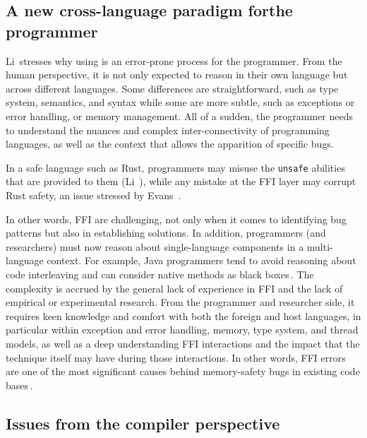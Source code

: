 \documentclass[nomenclature, english, bibtex]{kththesis}
\begin{document}
\subsection[A new cross-language paradigm for the programmer]{A new cross-language paradigm for\linebreak[4] the programmer}

Li\,\cite{li_improving_2014} stresses why using  is an error-prone process for the programmer. From the human perspective, it is not only expected to reason in their own language but across different languages. Some differences are straightforward, such as  type system, semantics, and syntax while some are more subtle, such as exceptions or error handling, or memory management. All of a sudden, the programmer needs to understand the nuances and complex inter-connectivity of programming languages, as well as the context that allows the apparition of specific bugs.

In a safe language such as Rust, programmers may misuse the \texttt{unsafe} abilities that are provided to them (Li \etal\,\cite{li_detecting_2022}), while any mistake at the FFI layer may corrupt Rust safety, an issue stressed by Evans \etal\,\cite{evans_is_2020}.

In other words, FFI are challenging, not only when it comes to identifying bug patterns but also in establishing solutions. In addition, programmers (and researchers) must now reason about single-language components in a multi-language context. 
For example, Java programmers tend to avoid reasoning about code interleaving and can consider native methods as black boxes\,\cite{li_improving_2014}. 
The complexity is accrued by the general lack of experience in FFI and the lack of empirical or experimental research. From the programmer and researcher side, it requires keen knowledge and comfort with both the foreign and host languages, in particular within exception and error handling, memory, type system, and thread models, as well as a deep understanding FFI interactions and the 
impact that the technique itself may have during those interactions.  In other words, FFI errors are one of the most significant causes behind memory-safety bugs in existing code bases\,\cite{li_improving_2014, patterson_linking_2017}.

\subsection{Issues from the compiler perspective}
\end{document}
